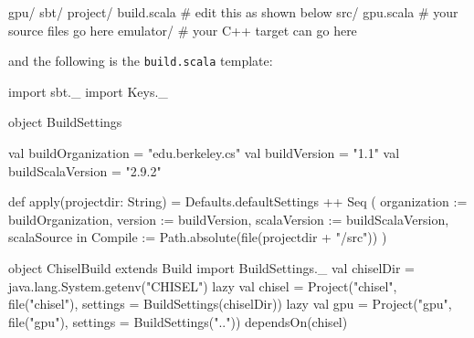 \documentclass[twocolumn, 10pt]{article}
\begin{document}
\begin{bash}
gpu/
  sbt/
    project/
      build.scala # edit this as shown below
  src/ 
    gpu.scala     # your source files go here
  emulator/       # your C++ target can go here
\end{bash}

\noindent
and the following is the \verb+build.scala+ template:

\begin{scala}
import sbt._
import Keys._

object BuildSettings {
  val buildOrganization = "edu.berkeley.cs"
  val buildVersion = "1.1"
  val buildScalaVersion = "2.9.2"

  def apply(projectdir: String) = {
    Defaults.defaultSettings ++ Seq (
      organization := buildOrganization,
      version      := buildVersion,
      scalaVersion := buildScalaVersion,
      scalaSource in Compile := 
        Path.absolute(file(projectdir + "/src"))
    )
  }
}

object ChiselBuild extends Build {
  import BuildSettings._
  val chiselDir = java.lang.System.getenv("CHISEL")
  lazy val chisel = 
    Project("chisel", file("chisel"), 
            settings = BuildSettings(chiselDir))
  lazy val gpu =
    Project("gpu", file("gpu"), 
            settings = BuildSettings("..")) 
      dependsOn(chisel)
}
\end{scala}
\end{document}
